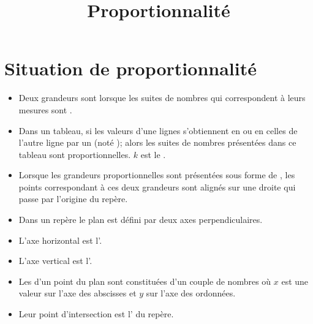 \documentclass[12pt,a4paper]{article}
\date{}
\title{Proportionnalité}
\begin{document}


\section{Situation de proportionnalité}

\begin{mydefs}
	\begin{itemize}
		\item 	Deux grandeurs sont  lorsque les suites de nombres qui correspondent à leurs mesures sont .
		
		\item Dans un tableau, si les valeurs d'une lignes s'obtiennent en  ou en  celles de l'autre ligne par un  (noté ); alors les suites de nombres présentées dans ce tableau sont proportionnelles. $k$ est le  .
		
		\item Lorsque les grandeurs proportionnelles sont présentées sous forme de , les points correspondant à ces deux grandeurs sont alignés sur une droite qui passe par l'origine du repère. 
		
	\end{itemize}

	
\end{mydefs}

\begin{myraps}
	\begin{itemize}
		\item Dans un repère  le plan est défini par deux axes perpendiculaires.
		\item L'axe horizontal est l'.
		\item L'axe vertical est l'.
		\item Les  d'un point du plan sont constituées d'un couple de nombres  où $x$ est une valeur sur l'axe des abscisses et $y$ sur l'axe des ordonnées.
		\item Leur point d'intersection est l' du repère.
	\end{itemize}
\end{myraps}
\end{document}
